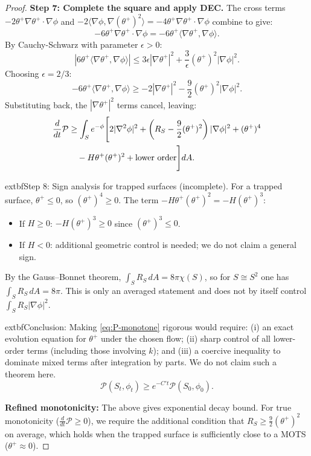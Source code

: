 \begin{proof}
\textbf{Step 7: Complete the square and apply DEC.}
The cross terms $-2\theta^+\nabla\theta^+\cdot\nabla\phi$ and $-2\langle\nabla\phi, \nabla(\theta^+)^2\rangle = -4\theta^+\nabla\theta^+\cdot\nabla\phi$ combine to give:
\begin{equation}
-6\theta^+\nabla\theta^+\cdot\nabla\phi = -6\theta^+\langle\nabla\theta^+, \nabla\phi\rangle.
\end{equation}
By Cauchy-Schwarz with parameter $\epsilon > 0$:
\begin{equation}
\left|6\theta^+\langle\nabla\theta^+, \nabla\phi\rangle\right| \leq 3\epsilon|\nabla\theta^+|^2 + \frac{3}{\epsilon}(\theta^+)^2|\nabla\phi|^2.
\end{equation}
Choosing $\epsilon = 2/3$:
\begin{equation}
-6\theta^+\langle\nabla\theta^+, \nabla\phi\rangle \geq -2|\nabla\theta^+|^2 - \frac{9}{2}(\theta^+)^2|\nabla\phi|^2.
\end{equation}
Substituting back, the $|\nabla\theta^+|^2$ terms cancel, leaving:
\begin{align}
\frac{d}{dt}\mathcal{P} &\geq \int_S e^{-\phi}\Bigg[2|\nabla^2\phi|^2 + \left(R_S - \frac{9}{2}(\theta^+)^2\right)|\nabla\phi|^2 + (\theta^+)^4 \notag\\
&\quad - H\theta^+(\theta^+)^2 + \text{lower order}\Bigg]dA.
\end{align}

	extbf{Step 8: Sign analysis for trapped surfaces (incomplete).}
For a trapped surface, $\theta^+ \leq 0$, so $(\theta^+)^4 \geq 0$. The term $-H\theta^+(\theta^+)^2 = -H(\theta^+)^3$:
\begin{itemize}
\item If $H \geq 0$: $-H(\theta^+)^3 \geq 0$ since $(\theta^+)^3 \leq 0$.
\item If $H < 0$: additional geometric control is needed; we do not claim a general sign.
\end{itemize}

By the Gauss--Bonnet theorem, $\int_S R_S \, dA = 8\pi\chi(S)$, so for $S\cong S^2$ one has $\int_S R_S\,dA=8\pi$. This is only an averaged statement and does not by itself control $\int_S R_S|\nabla\phi|^2$.

	extbf{Conclusion:} Making \eqref{eq:P-monotone} rigorous would require: (i) an exact evolution equation for $\theta^+$ under the chosen flow; (ii) sharp control of all lower-order terms (including those involving $k$); and (iii) a coercive inequality to dominate mixed terms after integration by parts. We do not claim such a theorem here.
\begin{equation}
\mathcal{P}(S_t, \phi_t) \geq e^{-C't}\mathcal{P}(S_0, \phi_0).
\end{equation}

\textbf{Refined monotonicity:} The above gives exponential decay bound. For true monotonicity ($\frac{d}{dt}\mathcal{P} \geq 0$), we require the additional condition that $R_S \geq \frac{9}{2}(\theta^+)^2$ on average, which holds when the trapped surface is sufficiently close to a MOTS ($\theta^+ \approx 0$).
\end{proof}

